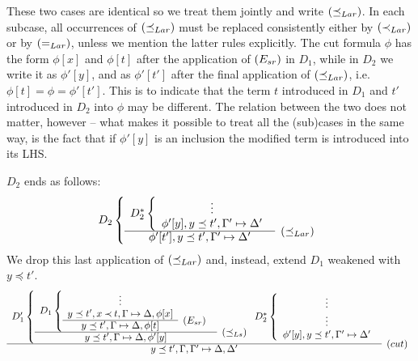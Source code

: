 \begin{PROOF}
\begin{LS}
\begin{LSA}
\begin{LSB}
These two cases are identical so we treat them jointly and
  write $(\preceq_{Lar})$. In each subcase, all occurrences of $(\preceq_{Lar})$ must be
  replaced consistently either by $(\mathbin{\prec}_{Lar})$ or by $(=_{Lar})$, unless we
  mention the latter rules explicitly. The cut formula $\phi$ 
has the form $\phi[x]$ and $\phi[t]$ after the application of $(E_{sr})$ in $D_1$, 
while in $D_2$ we 
write it as $\phi'[y]$, and as $\phi'[t']$ after the final application 
of $(\preceq_{Lar})$, i.e. 
 $\phi[t] = \phi = \phi'[t']$. This is to indicate that the term $t$ introduced in $D_1$ and
$t'$ introduced in $D_2$ into $\phi$ may be different. The relation between the two
 does not matter, however -- what makes it possible to treat all the (sub)cases in
the same way, is the fact that if $\phi'[y]$ is an inclusion the modified term is introduced into
its LHS.

$D_2$ ends as follows:
\[ D_2 \left \{ \begin{array}{cl}
 D_2^* \left \{ \begin{array}{cl}
 \vdots \\
 \phi'[y], y\preceq t', \Gamma'\Seq\Delta' \end{array} \right . \\ \cline{1-1}
 \phi'[t'], y\preceq t', \Gamma'\Seq\Delta' & \rabove{\pLar}
 \end{array} \right . \]
We drop this last application of $(\preceq_{Lar})$ and, instead, extend $D_1$
weakened with $y\preceq t'$. %
%
{ \footnotesize 
\[\begin{array}{cl}
D_1' \left \{ \begin{array}{cl}
D_1 \left \{ \begin{array}{cl}
  \vdots \\ 
  y\preceq t', x\Incl t,\Gamma\Seq\Delta, \phi[x]  \\ \cline{1-1}
y\preceq t', \Gamma\Seq\Delta, \phi[t]  & \rabove{\Esr}
 \end{array} \right . \\ \cline{1-1}
y\preceq t', \Gamma\Seq\Delta, \phi'[y] & \rabove{\pLs}
 \end{array} \right .
%
 D_2^*\left\{ \begin{array}{cl}
 \vdots \\
\vdots \\
\phi'[y], y\preceq t', \Gamma'\Seq\Delta' \end{array} \right .
 \\ \cline{1-1}
y\preceq t', \Gamma,\Gamma' \Seq \Delta,\Delta' &   \raisebox{1.2ex}[1.5ex][0ex]{($cut$)}

\end{array}\]}
\end{LSB}
\end{LSA}
\end{LS}
\end{PROOF}
